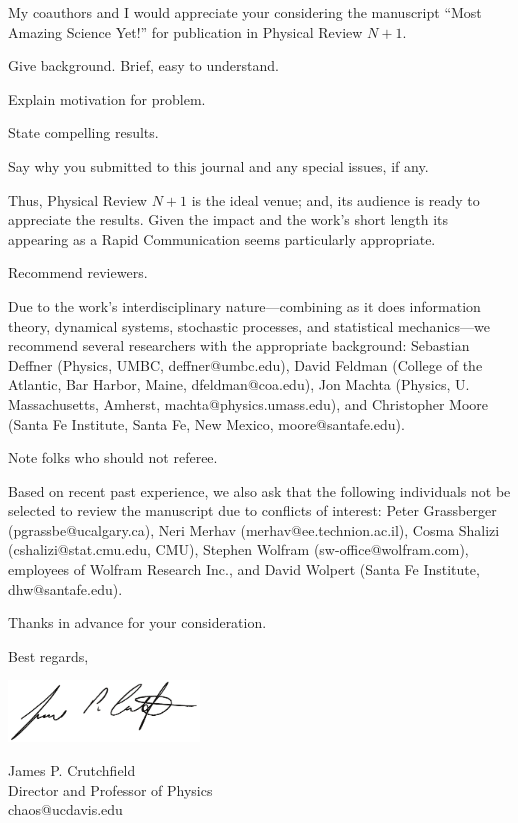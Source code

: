 \documentclass{article}
\begin{document}
My coauthors and I would appreciate your considering the manuscript ``Most
Amazing Science Yet!'' for publication in Physical Review $N+1$.

Give background. Brief, easy to understand.

Explain motivation for problem.

State compelling results.

Say why you submitted to this journal and any special issues, if any.

Thus, Physical Review $N+1$ is the ideal venue; and, its audience is ready to
appreciate the results. Given the impact and the work's short length its
appearing as a Rapid Communication seems particularly appropriate.

Recommend reviewers.

Due to the work's interdisciplinary nature---combining as it does information
theory, dynamical systems, stochastic processes, and statistical mechanics---we
recommend several researchers with the appropriate background: Sebastian
Deffner (Physics, UMBC, deffner@umbc.edu), David Feldman (College of the
Atlantic, Bar Harbor, Maine, dfeldman@coa.edu), Jon Machta (Physics, U.
Massachusetts, Amherst, machta@physics.umass.edu), and Christopher Moore (Santa
Fe Institute, Santa Fe, New Mexico, moore@santafe.edu).

Note folks who should not referee.

Based on recent past experience, we also ask that the following individuals not be selected to review the manuscript due to conflicts of interest: Peter Grassberger (pgrassbe@ucalgary.ca), Neri Merhav (merhav@ee.technion.ac.il), Cosma Shalizi (cshalizi@stat.cmu.edu, CMU), Stephen Wolfram (sw-office@wolfram.com), employees of Wolfram Research Inc., and David Wolpert (Santa Fe Institute, dhw@santafe.edu).

Thanks in advance for your consideration.

Best regards,

\includegraphics[trim = 0 0in 0 0in, width=2in]{JPCSignature}

James P. Crutchfield\\
Director and Professor of Physics\\
chaos@ucdavis.edu\\
\end{document}
